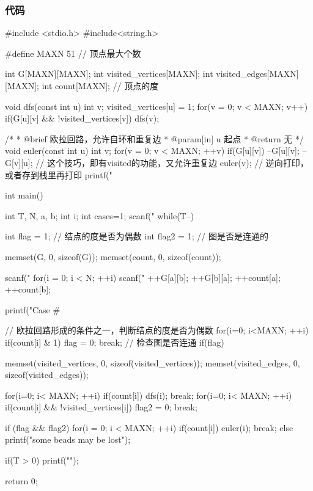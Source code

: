 \subsubsection{代码}
\begin{Codex}[label=eulerian_circuit.c]
#include <stdio.h>
#include<string.h>

#define MAXN 51  // 顶点最大个数

int G[MAXN][MAXN];
int visited_vertices[MAXN]; 
int visited_edges[MAXN][MAXN];
int count[MAXN]; // 顶点的度

void dfs(const int u) {  
    int v;
    visited_vertices[u] = 1;
    for(v = 0;  v < MAXN; v++) if(G[u][v] && !visited_vertices[v]) {
        dfs(v);
    }
}

/*
 * @brief 欧拉回路，允许自环和重复边
 * @param[in] u 起点
 * @return 无
 */
void euler(const int u){
    int v;
    for(v = 0; v < MAXN; ++v) if(G[u][v]){
        --G[u][v]; --G[v][u]; // 这个技巧，即有visited的功能，又允许重复边
        euler(v);
        // 逆向打印，或者存到栈里再打印
        printf("%
    }
}

int main() {
    int T, N, a, b;
    int i;
    int cases=1;
    scanf("%
    while(T--) {
        int flag = 1; // 结点的度是否为偶数
        int flag2 = 1; // 图是否是连通的
        
        memset(G, 0, sizeof(G));
        memset(count, 0, sizeof(count));

        scanf("%
        for(i = 0; i < N; ++i){
            scanf("%
            ++G[a][b];
            ++G[b][a];
            ++count[a];
            ++count[b];
        }

        printf("Case #%

        // 欧拉回路形成的条件之一，判断结点的度是否为偶数
        for(i=0; i<MAXN; ++i) {
            if(count[i] & 1){
                flag = 0;
                break;
            }
        }
        // 检查图是否连通
        if(flag) {
            memset(visited_vertices, 0, sizeof(visited_vertices));
            memset(visited_edges, 0, sizeof(visited_edges));

            for(i=0; i< MAXN; ++i) 
                if(count[i]) { 
                    dfs(i);
                    break; 
                }
            for(i=0; i< MAXN; ++i){
                if(count[i] && !visited_vertices[i]) {
                    flag2 = 0; 
                    break;
                }
            }
        }
        if (flag && flag2) {
            for(i = 0; i < MAXN; ++i) if(count[i]){
                euler(i);
                break;
            }
        } else {
            printf("some beads may be lost\n");
        }

        if(T > 0) printf("\n");
    }
    return 0;
}
\end{Codex}

